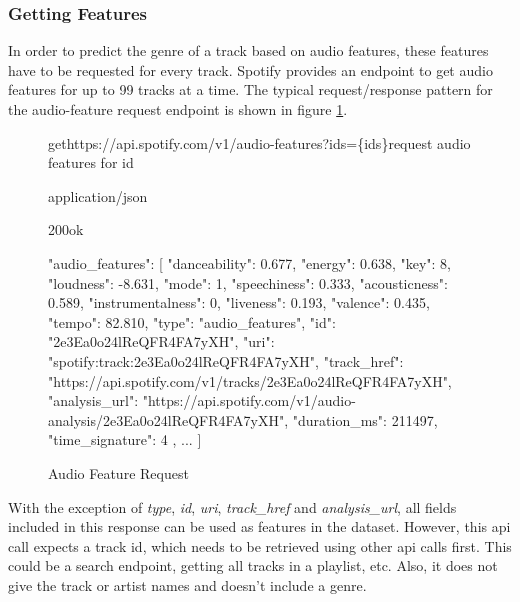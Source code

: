 \subsubsection{Getting Features}

In order to predict the genre of a track based on audio features, these features have to be requested
for every track. Spotify provides an endpoint to get audio features for up to 99 tracks at a time.
The typical request/response pattern for the audio-feature request endpoint is shown in figure \ref{fig:Audio Feature Request}.

\begin{figure}[H]
    \caption{Audio Feature Request}
	\label{fig:Audio Feature Request}
\begin{apiRoute}{get}{https://api.spotify.com/v1/audio-features?ids=\{ids\}}{request audio features for id}
    \methodJson
    \begin{routeParameter}
    \end{routeParameter}
    \begin{routeResponse}{application/json}
        \begin{routeResponseItem}{200}{ok}
            \begin{routeResponseItemBody}
{
    "audio_features": [
        {
            "danceability": 0.677,
            "energy": 0.638,
            "key": 8,
            "loudness": -8.631,
            "mode": 1,
            "speechiness": 0.333,
            "acousticness": 0.589,
            "instrumentalness": 0,
            "liveness": 0.193,
            "valence": 0.435,
            "tempo": 82.810,
            "type": "audio_features",
            "id": "2e3Ea0o24lReQFR4FA7yXH",
            "uri": "spotify:track:2e3Ea0o24lReQFR4FA7yXH",
            "track_href": "https://api.spotify.com/v1/tracks/2e3Ea0o24lReQFR4FA7yXH",
            "analysis_url": "https://api.spotify.com/v1/audio-analysis/2e3Ea0o24lReQFR4FA7yXH",
            "duration_ms": 211497,
            "time_signature": 4
        },
        ...
    ]
}
            \end{routeResponseItemBody}
        \end{routeResponseItem}
    \end{routeResponse}
\end{apiRoute}
\end{figure}

With the exception of \emph{type}, \emph{id}, \emph{uri}, \emph{track\_href} and \emph{analysis\_url}, all fields included in this response
can be used as features in the dataset. However, this api call expects a track id, which needs to be retrieved using
other api calls first. This could be a search endpoint, getting all tracks in a playlist, etc.
Also, it does not give the track or artist names and doesn't include a genre.

